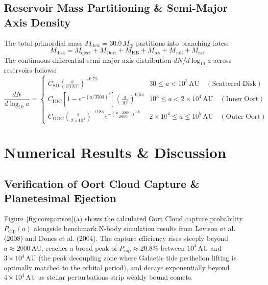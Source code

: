 \documentclass[11pt,a4paper]{article}
\begin{document}
\subsection{Reservoir Mass Partitioning \& Semi-Major Axis Density}
The total primordial mass $M_{\text{disk}} = 30.0\,M_\oplus$ partitions into branching fates:
\begin{equation}
M_{\text{disk}} = M_{\text{eject}} + M_{\text{Oort}} + M_{\text{KB}} + M_{\text{res}} + M_{\text{coll}} + M_{\text{ast}}
\label{eq:mass_conservation}
\end{equation}
The continuous differential semi-major axis distribution $dN / d\log_{10} a$ across reservoirs follows:
\begin{equation}
\frac{dN}{d\log_{10} a} = 
\begin{cases}
C_{\text{SD}} \left(\frac{a}{50\,\text{AU}}\right)^{-0.75} & 30 \le a < 10^3\,\text{AU} \quad (\text{Scattered Disk}) \\
C_{\text{IOC}} \left[1 - e^{-(a/3500)^2}\right] \left(\frac{a}{10^3}\right)^{0.55} & 10^3 \le a < 2\times 10^4\,\text{AU} \quad (\text{Inner Oort}) \\
C_{\text{OOC}} \left(\frac{a}{2\times 10^4}\right)^{-0.85} e^{-\left(\frac{a - 20000}{28000}\right)^{1.6}} & 2\times 10^4 \le a \le 10^5\,\text{AU} \quad (\text{Outer Oort})
\end{cases}
\label{eq:dn_dloga}
\end{equation}

\section{Numerical Results \& Discussion}

\subsection{Verification of Oort Cloud Capture \& Planetesimal Ejection}
Figure~\ref{fig:comparison}(a) shows the calculated Oort Cloud capture probability $P_{\text{cap}}(a)$ alongside benchmark N-body simulation results from Levison et al. (2008) and Dones et al. (2004). The capture efficiency rises steeply beyond $a \approx 2000\,\text{AU}$, reaches a broad peak of $P_{\text{cap}} \approx 20.8\%$ between $10^4\,\text{AU}$ and $3\times 10^4\,\text{AU}$ (the peak decoupling zone where Galactic tide perihelion lifting is optimally matched to the orbital period), and decays exponentially beyond $4\times 10^4\,\text{AU}$ as stellar perturbations strip weakly bound comets.
\end{document}

